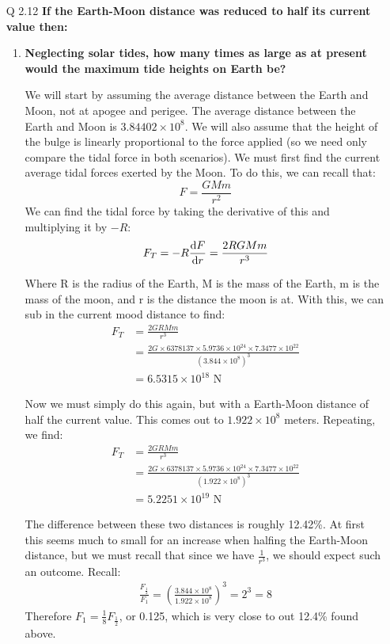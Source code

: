 \documentclass[10pt]{article}
\begin{document}
\begin{enumerate}
		
		
		\newpage
		\item [Q 2.12] \textbf{If the Earth-Moon distance was reduced to half its current value then: }
		\begin{enumerate}
			\item \textbf{Neglecting solar tides, how many times as large as at present would the maximum tide heights on Earth be?}
			
			We will start by assuming the average distance between the Earth and Moon, not at apogee and perigee. The average distance between the Earth and Moon is $3.84402\times 10^8$. We will also assume that the height of the bulge is linearly proportional to the force applied (so we need only compare the tidal force in both scenarios). We must first find the current average tidal forces exerted by the Moon. To do this, we can recall that:
			\[ F = \frac{GMm}{r^2} \]
			We can find the tidal force by taking the derivative of this and multiplying it by $-R$:
			\[ F_T = -R \dv{F}{r} = \frac{2RGMm}{r^3} \]
			
			Where R is the radius of the Earth, M is the mass of the Earth, m is the mass of the moon, and r is the distance the moon is at. With this, we can sub in the current mood distance to find:
			\begin{align*}
				F_T &= \frac{2GRMm}{r^3} \\
				&= \frac{2G \times 6378137 \times 5.9736 \times 10^{24} \times 7.3477 \times 10^{22}}{(3.844 \times 10^8)^3} \\
				&= 6.5315 \times 10^{18} \text{ N}
			\end{align*}
			
			Now we must simply do this again, but with a Earth-Moon distance of half the current value. This comes out to $1.922 \times 10^8$ meters. Repeating, we find:
			\begin{align*}
			F_T &= \frac{2GRMm}{r^3} \\
			&= \frac{2G \times 6378137 \times 5.9736 \times 10^{24} \times 7.3477 \times 10^{22}}{(1.922 \times 10^8)^3} \\
			&= 5.2251 \times 10^{19} \text{ N}
			\end{align*}
			
			The difference between these two distances is roughly 12.42\%. At first this seems much to small for an increase when halfing the Earth-Moon distance, but we must recall that since we have $\frac{1}{r^3}$, we should expect such an outcome. Recall:
			\begin{align*}
				\frac{F_\frac{1}{2}}{F_1} = \left( \frac{3.844 \times 10^8}{1.922 \times 10^8}\right)^3 = 2^3 = 8
			\end{align*}
			Therefore $F_1 = \frac{1}{8} F_\frac{1}{2}$, or 0.125, which is very close to out 12.4\% found above.
			

\end{enumerate}
\end{enumerate}
\end{document}
